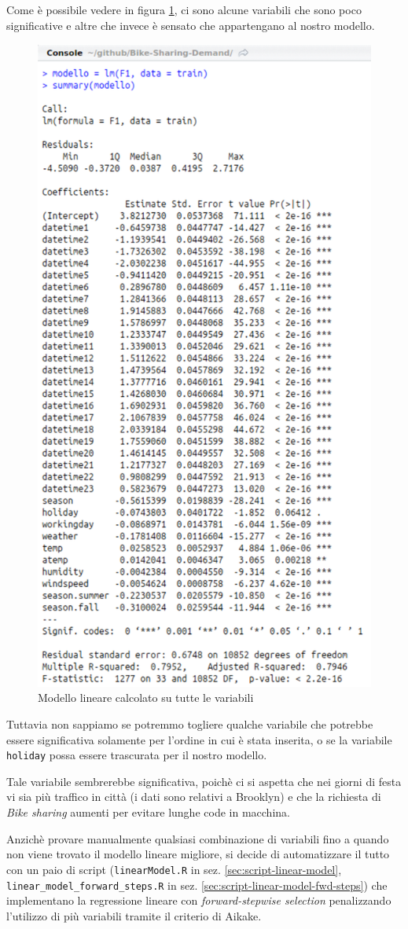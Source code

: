 Come è possibile vedere in figura \ref{fig:simpl-lm-log-qqplot}, ci sono
alcune variabili che sono poco significative e altre che invece è sensato che
appartengano al nostro modello.

\begin{figure}[H]
  \centering
  \includegraphics[width=.55\columnwidth]{images/lm/lm-with-all-vars.eps}
  \caption{Modello lineare calcolato su tutte le variabili}
  \label{fig:simpl-lm-log-qqplot}
\end{figure}

Tuttavia non sappiamo se potremmo togliere qualche variabile che potrebbe
essere significativa solamente per l'ordine in cui è stata inserita, o se la
variabile \texttt{holiday} possa essere trascurata per il nostro modello.

Tale variabile sembrerebbe significativa, poichè ci si aspetta che nei giorni
di festa vi sia più traffico in città (i dati sono relativi a Brooklyn) e che
la richiesta di \emph{Bike sharing} aumenti per evitare lunghe code in
macchina.

Anzichè provare manualmente qualsiasi combinazione di variabili fino a quando
non viene trovato il modello lineare migliore, si decide di automatizzare il
tutto con un paio di script (\texttt{linearModel.R} in sez.
\ref{sec:script-linear-model}, \texttt{linear\_model\_forward\_steps.R} in
sez. \ref{sec:script-linear-model-fwd-steps}) che implementano la regressione
lineare con \emph{forward-stepwise selection} penalizzando l'utilizzo di più
variabili tramite il criterio di Aikake.

